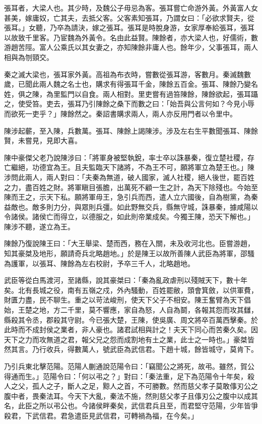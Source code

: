 
\begin{pinyinscope}
張耳者，大梁人也。其少時，及魏公子毋忌為客。張耳嘗亡命游外黃。外黃富人女甚美，嫁庸奴，亡其夫，去抵父客。父客素知張耳，乃謂女曰：「必欲求賢夫，從張耳。」女聽，乃卒為請決，嫁之張耳。張耳是時脫身游，女家厚奉給張耳，張耳以故致千里客。乃宦魏為外黃令。名由此益賢。陳餘者，亦大梁人也，好儒術，數游趙苦陘。富人公乘氏以其女妻之，亦知陳餘非庸人也。餘年少，父事張耳，兩人相與為刎頸交。

秦之滅大梁也，張耳家外黃。高祖為布衣時，嘗數從張耳游，客數月。秦滅魏數歲，已聞此兩人魏之名士也，購求有得張耳千金，陳餘五百金。張耳、陳餘乃變名姓，俱之陳，為里監門以自食。兩人相對。里吏嘗有過笞陳餘，陳餘欲起，張耳躡之，使受笞。吏去，張耳乃引陳餘之桑下而數之曰：「始吾與公言何如？今見小辱而欲死一吏乎？」陳餘然之。秦詔書購求兩人，兩人亦反用門者以令里中。

陳涉起蘄，至入陳，兵數萬。張耳、陳餘上謁陳涉。涉及左右生平數聞張耳、陳餘賢，未嘗見，見即大喜。

陳中豪傑父老乃說陳涉曰：「將軍身被堅執銳，率士卒以誅暴秦，復立楚社稷，存亡繼絕，功德宜為王。且夫監臨天下諸將，不為王不可，願將軍立為楚王也。」陳涉問此兩人，兩人對曰：「夫秦為無道，破人國家，滅人社稷，絕人後世，罷百姓之力，盡百姓之財。將軍瞋目張膽，出萬死不顧一生之計，為天下除殘也。今始至陳而王之，示天下私。願將軍毋王，急引兵而西，遣人立六國後，自為樹黨，為秦益敵也。敵多則力分，與眾則兵彊。如此野無交兵，縣無守城，誅暴秦，據咸陽以令諸侯。諸侯亡而得立，以德服之，如此則帝業成矣。今獨王陳，恐天下解也。」陳涉不聽，遂立為王。

陳餘乃復說陳王曰：「大王舉梁、楚而西，務在入關，未及收河北也。臣嘗游趙，知其豪桀及地形，願請奇兵北略趙地。」於是陳王以故所善陳人武臣為將軍，邵騷為護軍，以張耳、陳餘為左右校尉，予卒三千人，北略趙地。

武臣等從白馬渡河，至諸縣，說其豪桀曰：「秦為亂政虐刑以殘賊天下，數十年矣。北有長城之役，南有五嶺之戍，外內騷動，百姓罷敝，頭會箕斂，以供軍費，財匱力盡，民不聊生。重之以苛法峻刑，使天下父子不相安。陳王奮臂為天下倡始，王楚之地，方二千里，莫不響應，家自為怒，人自為鬬，各報其怨而攻其讎，縣殺其令丞，郡殺其守尉。今已張大楚，王陳，使吳廣、周文將卒百萬西擊秦。於此時而不成封侯之業者，非人豪也。諸君試相與計之！夫天下同心而苦秦久矣。因天下之力而攻無道之君，報父兄之怨而成割地有土之業，此士之一時也。」豪桀皆然其言。乃行收兵，得數萬人，號武臣為武信君。下趙十城，餘皆城守，莫肯下。

乃引兵東北擊范陽。范陽人蒯通說范陽令曰：「竊聞公之將死，故弔。雖然，賀公得通而生。」范陽令曰：「何以弔之？」對曰：「秦法重，足下為范陽令十年矣，殺人之父，孤人之子，斷人之足，黥人之首，不可勝數。然而慈父孝子莫敢倳刃公之腹中者，畏秦法耳。今天下大亂，秦法不施，然則慈父孝子且倳刃公之腹中以成其名，此臣之所以弔公也。今諸侯畔秦矣，武信君兵且至，而君堅守范陽，少年皆爭殺君，下武信君。君急遣臣見武信君，可轉禍為福，在今矣。」


\end{pinyinscope}
